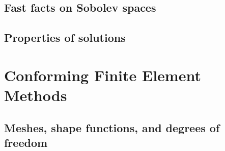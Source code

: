 \documentclass[USEnglish,ignorenonframetext,notheorems,aspectratio=1610]{beamer}
\begin{document}
\subsection{Fast facts on Sobolev spaces}
\frame{\tableofcontents[currentsection,subsectionstyle=show/shaded/hide]}

\frame {}
\frame {}
\frame {
  }
\frame {
  }

\frame {}
\frame {}
\frame {}
\frame {
  }
\frame {}
\frame {
  }

\subsection{Properties of solutions}
\frame{\tableofcontents[currentsection,subsectionstyle=show/shaded/hide]}

\frame {
  
  
  }
\frame {
  
  
  }
\frame {}

\section{Conforming Finite Element Methods}
\frame{\sectoc}
\subsection{Meshes, shape functions, and degrees of freedom}
\frame {
  }
\frame {
}
\frame {
  }
\frame {}
\frame {}
\frame {}
\frame {
  }
\end{document}
